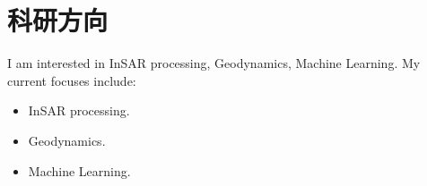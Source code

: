 \documentclass{mycv_cn}
\begin{document}
\maketitle%

\section{科研方向}

I am interested in InSAR processing, Geodynamics, Machine Learning. My current focuses include:

\begin{itemize}
  \item InSAR processing.
  \item Geodynamics.
  \item Machine Learning.
\end{itemize}
\end{document}
